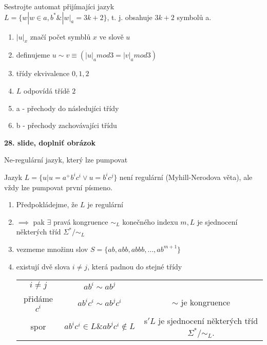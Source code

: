 \documentclass[../main.tex]{subfiles}
\begin{document}
\begin{example}
    Sestrojte automat přijímajíci jazyk \\
    $L = \{w|w \in {a,b}^* \& |w|_a = 3k + 2\}$, t. j. obsahuje $3k+2$ symbolů a.
    \begin{enumerate}
        \item $|u|_x$ značí počet symblů $x$ ve slově $u$
        \item definujeme $u \sim v \equiv (|u|_a mod 3 = |v|_a mod 3)$
        \item třídy ekvivalence $0,1,2$
        \item $L$ odpovídá třídě $2$
        \item a - přechody do následujíci třídy
        \item b - přechody zachovávajíci třídu
    \end{enumerate}
    \textbf{28. slide, doplniť obrázok}
\end{example}

\begin{example}
    Ne-regulární jazyk, který lze pumpovat

    Jazyk $L=\{u|u = a^+b^ic^i\vee u = b^ic^j\}$ není regulární (Myhill-Nerodova věta), ale 
    vždy lze pumpovat první písmeno.
    \begin{enumerate}
        \item Předpokládejme, že $L$ je regulární
        \item $\implies$ pak $\exists$ pravá kongruence $\sim_L$ konečného indexu $m, L$ je sjednocení
        některých tříd $\Sigma^*/\sim_L$
        \item vezmeme množinu slov $S = \{ab,abb,abbb,\dots,ab^{m+1}\}$
        \item existují dvě slova $i \neq j$, která padnou do stejné třídy\\
        \begin{tabular}{c c c}
            $i \neq j$ & $ab^i \sim ab^j$ & \\
            přidáme $c^i$ & $ab^ic^i \sim ab^jc^i$ & $\sim$ je kongruence \\
            spor & $ab^ic^i \in L \& ab^jc^i \notin L$ & s$'L$ je sjednocení některých tříd $\Sigma^*/\sim_L$. 
        \end{tabular}
    \end{enumerate}
\end{example}
\end{document}
